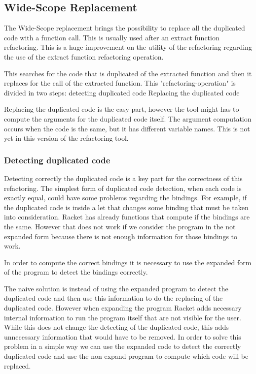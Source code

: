 \subsection{Wide-Scope Replacement} %
The Wide-Scope replacement brings the possibility to replace all the duplicated
code with a function call. This is usually used after an extract function refactoring.
This is a huge improvement on the utility of the refactoring regarding the use
of the extract function refactoring operation.

This searches for the code that is duplicated of the extracted function and then it replaces for the call of the
extracted function.
This "refactoring-operation" is divided in two steps:
detecting duplicated code
Replacing the duplicated code

Replacing the duplicated code is the easy part, however the tool might has to compute
the arguments for the duplicated code itself. The argument computation occurs when
the code is the same, but it has different variable names. This is not yet in this
version of the refactoring tool.

\subsubsection{Detecting duplicated code}
Detecting correctly the duplicated code is a key part for the correctness of this refactoring.
The simplest form of duplicated code detection, when each code is exactly equal,
could have some problems regarding the bindings.
For example, if the duplicated code is inside a let that changes some binding that must
be taken into consideration.
Racket has already functions that compute if the bindings are the same.
However that does not work if we consider the program in the not expanded
form because there is not enough information for those bindings to work.


In order to compute the correct bindings it is necessary to use the expanded form
of the program to detect the bindings correctly.

The naive solution is instead of using the expanded program to detect the duplicated
 code and then use this information to do the replacing of the duplicated code.
However when expanding the program Racket adds necessary internal information to
run the program itself that are not visible for the user.
While this does not change the detecting of the duplicated code, this adds unnecessary information
that would have to be removed.
In order to solve this problem in a simple way we can use the expanded code to detect
the correctly duplicated code and use the non expand program
to compute which code will be replaced.

